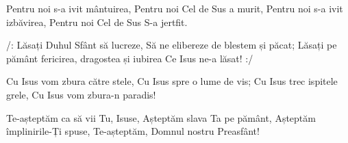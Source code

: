 \beginverse
Pentru noi s-a ivit mântuirea,
Pentru noi Cel de Sus a murit,
Pentru noi s-a ivit izbăvirea,
Pentru noi Cel de Sus S-a jertfit.
\endverse

\beginchorus
/: Lăsați Duhul Sfânt să lucreze,
Să ne elibereze de blestem și păcat;
Lăsați pe pământ fericirea, dragostea și iubirea
Ce Isus ne-a lăsat! :/
\endchorus

\beginverse
Cu Isus vom zbura către stele,
Cu Isus spre o lume de vis;
Cu Isus trec ispitele grele,
Cu Isus vom zbura-n paradis!
\endverse

\beginverse
Te-așteptăm ca să vii Tu, Isuse,
Așteptăm slava Ta pe pământ,
Așteptăm împlinirile-Ți spuse,
Te-așteptăm, Domnul nostru Preasfânt!
\endverse
\endsong